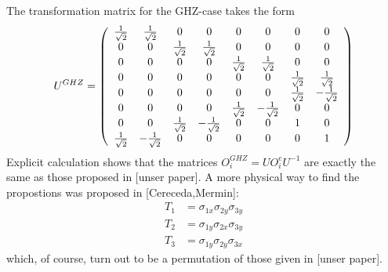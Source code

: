 The transformation matrix for the GHZ-case takes the form
\begin{equation}
U^{GHZ}=\left(\begin{array}{cccccccc}
{1 \over \sqrt{2}} & {1 \over \sqrt{2}} & 0 & 0 & 0 & 0 & 0 & 0 \\
0 & 0 & {1 \over \sqrt{2}} & {1 \over \sqrt{2}} & 0 & 0 & 0 & 0 \\
0 & 0 & 0 & 0 & {1 \over \sqrt{2}} & {1 \over \sqrt{2}} & 0 & 0 \\
0 & 0 & 0 & 0 & 0 & 0 & {1 \over \sqrt{2}} & {1 \over \sqrt{2}} \\
0 & 0 & 0 & 0 & 0 & 0 & {1 \over \sqrt{2}} & -{1 \over \sqrt{2}} \\
0 & 0 & 0 & 0 & {1 \over \sqrt{2}} & -{1 \over \sqrt{2}} & 0 & 0 \\
0 & 0 & {1 \over \sqrt{2}} & -{1 \over \sqrt{2}} & 0 & 0 & 1 & 0 \\
{1 \over \sqrt{2}} & -{1 \over \sqrt{2}} & 0 & 0 & 0 & 0 & 0 & 1
\end{array}\right)
\end{equation}
Explicit calculation shows that the matrices $O^{GHZ}_i=U O^e_i U^{-1}$ are exactly the same as those proposed in [unser paper].
A more physical way to find the propostions was proposed in [Cereceda,Mermin]:
\begin{eqnarray}
T_1&=\sigma_{1x}\sigma_{2y}\sigma_{3y} \\
T_2&=\sigma_{1y}\sigma_{2x}\sigma_{3y} \\
T_3&=\sigma_{1y}\sigma_{2y}\sigma_{3x}
\end{eqnarray}
which, of course, turn out to be a permutation of those given in [unser paper].





